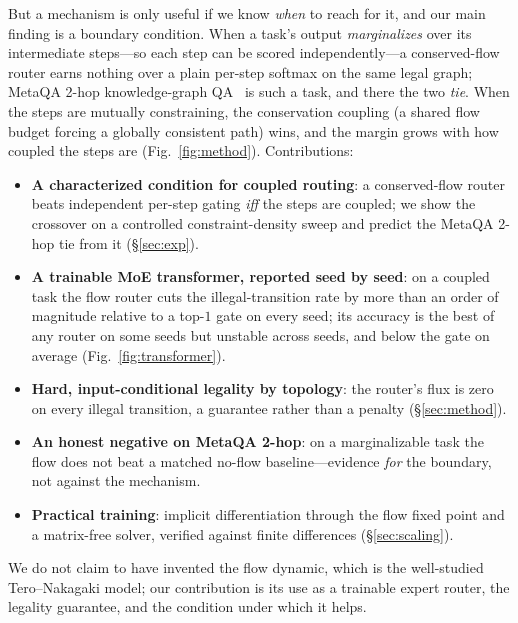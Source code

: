 \documentclass{article} %
\begin{document}
But a mechanism is only useful if we know \emph{when} to reach for it, and our main finding is a
boundary condition. When a task's output \emph{marginalizes} over its intermediate steps---so each
step can be scored independently---a conserved-flow router earns nothing over a plain per-step
softmax on the same legal graph; MetaQA 2-hop knowledge-graph QA~\citep{zhang2018metaqa} is such a
task, and there the two \emph{tie}. When the steps are mutually constraining, the conservation
coupling (a shared flow budget forcing a globally consistent path) wins, and the margin grows
with how coupled the steps are (Fig.~\ref{fig:method}). Contributions:
\begin{itemize}
  \item \textbf{A characterized condition for coupled routing}: a conserved-flow router beats
        independent per-step gating \emph{iff} the steps are coupled; we show the crossover on a
        controlled constraint-density sweep and predict the MetaQA 2-hop tie from it
        (\S\ref{sec:exp}).
  \item \textbf{A trainable MoE transformer, reported seed by seed}: on a coupled task the flow
        router cuts the illegal-transition rate by more than an order of magnitude relative to a
        top-$1$ gate on every seed; its accuracy is the best of any router on some seeds but
        unstable across seeds, and below the gate on average (Fig.~\ref{fig:transformer}).
  \item \textbf{Hard, input-conditional legality by topology}: the router's flux is zero on every
        illegal transition, a guarantee rather than a penalty (\S\ref{sec:method}).
  \item \textbf{An honest negative on MetaQA 2-hop}: on a marginalizable task the flow does not
        beat a matched no-flow baseline---evidence \emph{for} the boundary, not against the mechanism.
  \item \textbf{Practical training}: implicit differentiation through the flow fixed point and a
        matrix-free solver, verified against finite differences (\S\ref{sec:scaling}).
\end{itemize}
We do not claim to have invented the flow dynamic, which is the well-studied Tero--Nakagaki model;
our contribution is its use as a trainable expert router, the legality guarantee, and the condition
under which it helps.
\end{document}
